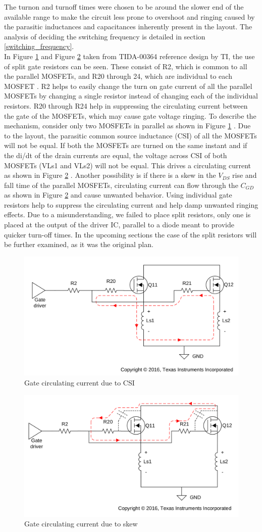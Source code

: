 The turnon and turnoff times were chosen to be around the slower end of the available range to make the circuit less prone to overshoot and ringing caused by the parasitic inductances and capacitances inherently present in the layout. The analysis of deciding the switching frequency is detailed in section \ref{switching_frequency}. \\

In Figure \ref{fig:CSI_current} and Figure \ref{fig:skew_current} taken from TIDA-00364\cite{TIDA-00364} reference design by TI, the use of split gate resistors can be seen. These consist of R2, which is common to all the parallel MOSFETs, and R20 through 24, which are individual to each MOSFET . R2 helps to easily change the turn on gate current of all the parallel MOSFETs by changing a single resistor instead of changing each of the individual resistors. R20 through R24 help in suppressing the circulating current between the gate of the MOSFETs, which may cause gate voltage ringing. To describe the mechanism, consider only two MOSFETs in parallel as shown in Figure \ref{fig:CSI_current} . Due to the layout, the parasitic common source inductance (CSI) of all the MOSFETs will not be equal. If both the MOSFETs are turned on the same instant and if the di/dt of the drain currents are equal, the voltage across CSI of both MOSFETs (VLs1 and VLs2) will not be equal. This drives a circulating current as shown in Figure \ref{fig:skew_current} . Another possibility is if there is a skew in the $V_{DS}$ rise and fall time of the parallel MOSFETs, circulating current can flow through the $C_{GD}$ as shown in Figure \ref{fig:skew_current} and cause unwanted behavior. Using individual gate resistors help to suppress the circulating current and help damp unwanted ringing effects. Due to a misunderstanding, we failed to place split resistors, only one is placed at the output of the driver IC, parallel to a diode meant to provide quicker turn-off times. In the upcoming sections the case of the split resistors will be further examined, as it was the original plan.

\begin{figure}[H]
	\centering
	\includegraphics[width=0.6\linewidth]{pictures/hardware/Driver_Board/CSI.png}
	\caption{Gate circulating current due to CSI}
	\label{fig:CSI_current}
\end{figure}

\begin{figure}[H]
	\centering
	\includegraphics[width=0.6\linewidth]{pictures/hardware/Driver_Board/skew.png}
	\caption{Gate circulating current due to skew}
	\label{fig:skew_current}
\end{figure}